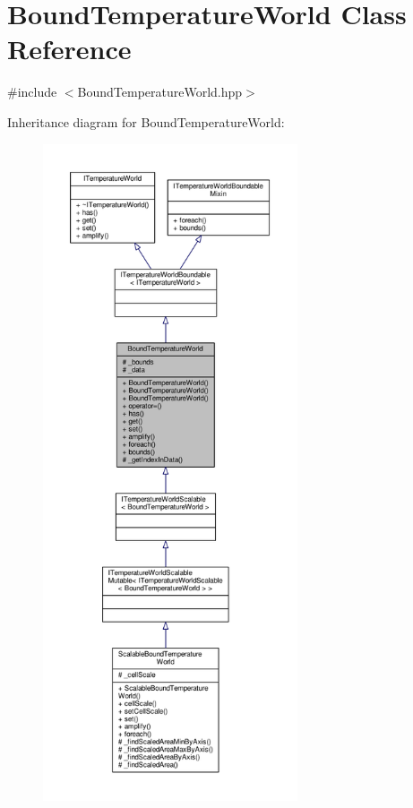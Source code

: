 \hypertarget{class_bound_temperature_world}{\section{Bound\-Temperature\-World Class Reference}
\label{class_bound_temperature_world}
}


{\ttfamily \#include $<$Bound\-Temperature\-World.\-hpp$>$}



Inheritance diagram for Bound\-Temperature\-World\-:
\nopagebreak
\begin{figure}[H]
\begin{center}
\leavevmode
\includegraphics[height=550pt]{class_bound_temperature_world__inherit__graph}
\end{center}
\end{figure}


